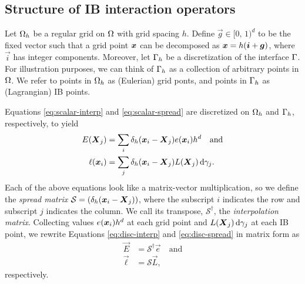 \subsection{Structure of IB interaction operators}

Let $\Omega_h$ be a regular grid on $\Omega$ with grid spacing $h$. Define
$\vec{g} \in [0,\,1)^d$ to be the fixed vector such that a grid point $\boldsymbol{x}$
can be decomposed as $\boldsymbol{x}=h(\boldsymbol{i}+\boldsymbol{g})$, where $\vec{i}$ has integer
components. Moreover, let $\Gamma_h$ be a discretization of the interface
$\Gamma$. For illustration purposes, we can think of $\Gamma_h$ as a
collection of arbitrary points in $\Omega$. We refer to points in $\Omega_h$
as (Eulerian) grid ponts, and points in $\Gamma_h$ as (Lagrangian) IB
points.

Equations \eqref{eq:scalar-interp} and \eqref{eq:scalar-spread} are discretized
on $\Omega_h$ and $\Gamma_h$, respectively, to yield
\begin{align}
    \label{eq:disc-interp}
    E(\X_j) &= \sum_i \delta_h(\x_i-\X_j)e(\x_i) h^d \quad \text{and} \\
    \label{eq:disc-spread}
    \ell(\x_i) &= \sum_j \delta_h(\x_i-\X_j)L(\X_j) \d\gamma_j.
\end{align}
Each of the above equations look like a matrix-vector multiplication, so we 
define the \emph{spread matrix} $\mathcal{S}=(\delta_h(\boldsymbol{x}_i-\boldsymbol{X}_j))$, where the
subscript $i$ indicates the row and subscript $j$ indicates the column. We call
its transpose, $\mathcal{S}^\dagger$, the \emph{interpolation matrix}.
Collecting values $e(\boldsymbol{x}_i)h^d$ at each grid point and $L(\X_j)\d\gamma_j$ at
each IB point, we rewrite Equations \eqref{eq:disc-interp} and
\eqref{eq:disc-spread} in matrix form as
\begin{align}
    \label{eq:matrix-interp}
    \vec{E} &= \mathcal{S}^\dagger\vec{e} \quad\text{and} \\
    \label{eq:matrix-spread}
    \vec{\ell} &= \mathcal{S}\vec{L},
\end{align}
respectively.

